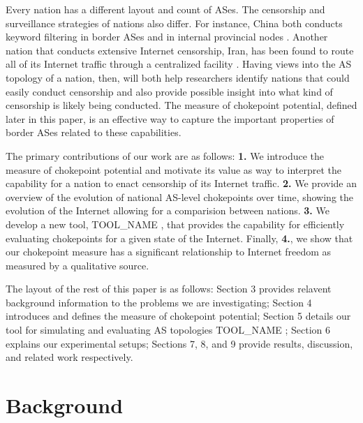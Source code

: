 \documentclass{article}
\newcommand{\toolname}{{\color{blue}TOOL\_NAME }}
\begin{document}
\begin{multicols}{2}
\par
Every nation has a different layout and count of ASes. The censorship and surveillance strategies of nations also differ. For instance,
China both conducts keyword filtering in border ASes and in internal provincial nodes \cite{chinafiltering}. Another nation that conducts
extensive Internet censorship, Iran, has been found to route all of its Internet traffic through a centralized facility \cite{irancensor}.
Having views into the AS topology of a nation, then, will both help researchers identify nations that could easily conduct censorship and
also provide possible insight into what kind of censorship is likely being conducted. The measure of chokepoint potential, defined later in this paper,
is an effective way to capture the important properties of border ASes related to these capabilities.

\par
The primary contributions of our work are as follows: \textbf{1.} We introduce the measure of chokepoint potential and 
motivate its value as way to interpret the capability for a nation to enact censorship of its Internet traffic. \textbf{2.} We
provide an overview of the evolution of national AS-level chokepoints over time, showing the evolution of the Internet
allowing for a comparision between nations. \textbf{3.} We develop a new tool, \toolname, that provides the capability for
efficiently evaluating chokepoints for a given state of the Internet. Finally, \textbf{4.}, we show that our chokepoint measure
has a significant relationship to Internet freedom as measured by a qualitative source.


\par
The layout of the rest of this paper is as follows: Section 3 provides relavent background information
to the problems we are investigating; Section 4 introduces and defines the measure of chokepoint
potential; Section 5 details our tool for simulating and evaluating AS topologies \toolname; Section 6
explains our experimental setups; Sections 7, 8, and 9 provide results, discussion, and related work
respectively.

\section{Background}


\end{multicols}
\end{document}
